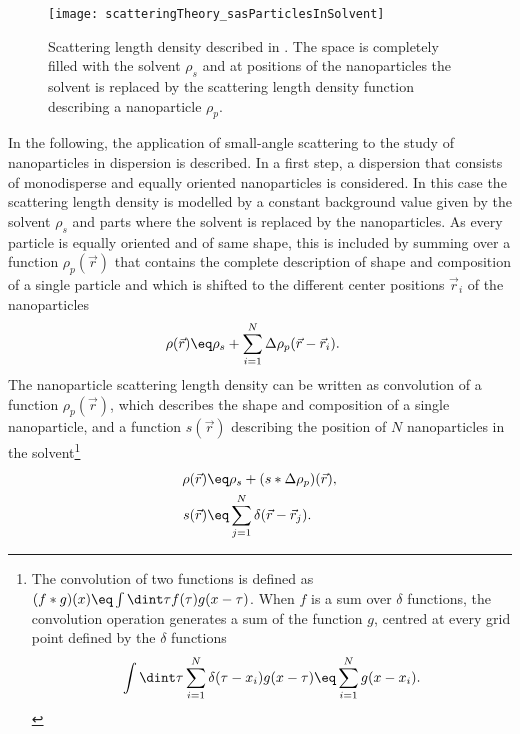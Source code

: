 \documentclass[\main/dresen_thesis.tex]{subfiles}
\begin{document}
    \begin{figure}[tb]
      \centering
      \texttt{[image: scatteringTheory\_sasParticlesInSolvent]}
      \caption{\label{fig:theoreticalBackground:scattering:scatteringTheory:sasParticlesInSolvent}Scattering length density described in . The space is completely filled with the solvent $\rho_s$ and at positions of the nanoparticles the solvent is replaced by the scattering length density function describing a nanoparticle $\rho_p$.}
    \end{figure}
    In the following, the application of small-angle scattering to the study of nanoparticles in dispersion is described.
    In a first step, a dispersion that consists of monodisperse and equally oriented nanoparticles is considered.
    In this case the scattering length density is modelled by a constant background value given by the solvent $\rho_s$ and parts where the solvent is replaced by the nanoparticles.
    As every particle is equally oriented and of same shape, this is included by summing over a function $\rho_p (\vec{r})$ that contains the complete description of shape and composition of a single particle and which is shifted to the different center positions $\vec{r}_i$ of the nanoparticles
    \begin{align}
      \rho(\vec{r}) \eq& \rho_s + \sum_{i=1}^N \Delta \rho_{p}(\vec{r} - \vec{r}_i).\label{eq:theoreticalBackground:scattering:scatteringTheory:sasParticlesInSolvent}
    \end{align}
    The nanoparticle scattering length density can be written as convolution of a function $\rho_{p}(\vec{r})$, which describes the shape and composition of a single nanoparticle, and a function $s(\vec{r})$ describing the position of $N$ nanoparticles in the solvent\footnote{The convolution of two functions is defined as $(f*g)(x) \eq \int \dint \tau f(\tau) g(x-\tau)$.
    When $f$ is a sum over $\delta$ functions, the convolution operation generates a sum of the function $g$, centred at every grid point defined by the $\delta$ functions
    \begin{equation}
      \int \dint \tau \sum_{i=1}^N \delta(\tau - x_i) g(x-\tau) \eq \sum_{i=1}^N g(x - x_i).
    \end{equation}}
    \begin{align}
      \rho(\vec{r}) \eq& \rho_s + (s * \Delta \rho_{p})(\vec{r}),\\
      s(\vec{r}) \eq& \sum_{j=1}^N \delta(\vec{r} - \vec{r}_j).
    \end{align}
\end{document}
